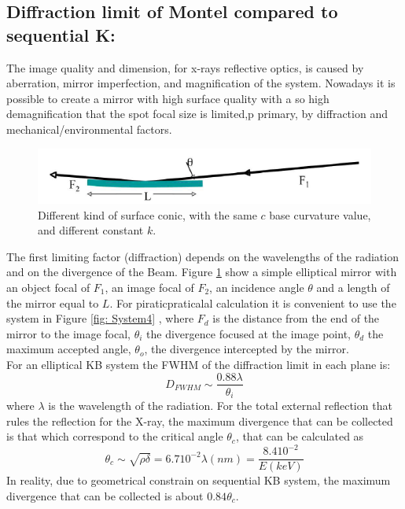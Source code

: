 \subsection{Diffraction limit of Montel compared to sequential K:}
The image quality and dimension, for x-rays reflective optics, is  caused by aberration, mirror imperfection, and magnification of the system. Nowadays it is possible to create a mirror with high surface quality with a so high demagnification that the spot focal size is limited,p primary, by diffraction and mechanical/environmental factors.
\begin{figure}[H]
%
\centering
%
\includegraphics[width=.7\textwidth]{Immagini/Chapter2/System3}
%
\caption{Different kind of surface conic, with the same $c $ base curvature value, and different constant $k $.}
%
\label{fig: System3}
%
\end{figure}
The first limiting factor (diffraction) depends on the wavelengths of the radiation and on the divergence of the Beam. Figure \ref{fig: System3} show a simple elliptical mirror with an object focal of $F_1 $, an image focal of $F_2 $, an incidence angle $\theta $ and a length of the mirror equal to $L $. For piraticpraticalal calculation it is convenient to use the system in Figure \ref{fig: System4} , where $F_d $ is the distance from the end of the mirror to the image focal, $\theta_i $ the divergence focused at the image point, $\theta_d $ the maximum accepted angle, $\theta_o $, the divergence intercepted by the mirror.
\\
For an elliptical KB system the FWHM of the diffraction limit in each plane is:
\begin{equation}
D_{FWHM} \sim  \frac{0.88 \lambda}{\theta_i}
\label{eq: D_FWHM}
\end{equation}
\noindent where $\lambda $ is the wavelength of the radiation. For the total external reflection that rules the reflection for the X-ray, the maximum divergence that can be collected is that which correspond to the critical angle $\theta_c $, that can be calculated as
\begin{equation}
\theta_c \sim \sqrt{\rho \delta} = 6.7 10^{-2} \lambda (nm) = \frac{8.4 10^{-2}}{E(keV)}
\label{eq: theta_c}
\end{equation}
\noindent In reality, due to geometrical constrain on sequential KB system, the maximum divergence that can be collected is about $0.84 \theta_c $.
